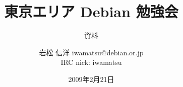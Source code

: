 




\documentclass[cjk,dvipdfmx,12pt]{beamer}
\usepackage{monthlypresentation}



\title{東京エリア Debian 勉強会}
\subtitle{資料}
\author{岩松 信洋 iwamatsu@debian.or.jp\\IRC nick: iwamatsu}
\date{2009年2月21日}



